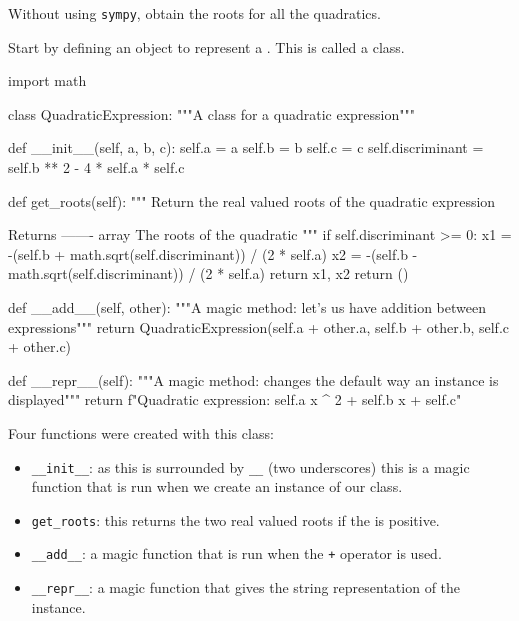 Without using \texttt{sympy}, obtain the roots for all the quadratics.

Start by defining an object to represent a . This is called a
class.


\begin{pyin}
import math


class QuadraticExpression:
    """A class for a quadratic expression"""

    def __init__(self, a, b, c):
        self.a = a
        self.b = b
        self.c = c
        self.discriminant = self.b ** 2 - 4 * self.a * self.c

    def get_roots(self):
        """
        Return the real valued roots of the quadratic expression

        Returns
        -------
        array
            The roots of the quadratic
        """
        if self.discriminant >= 0:
            x1 = -(self.b + math.sqrt(self.discriminant)) / (2 * self.a)
            x2 = -(self.b - math.sqrt(self.discriminant)) / (2 * self.a)
            return x1, x2
        return ()

    def __add__(self, other):
        """A magic method: let's us have addition between expressions"""
        return QuadraticExpression(self.a + other.a, self.b + other.b, self.c + other.c)

    def __repr__(self):
        """A magic method: changes the default way an instance is displayed"""
        return f"Quadratic expression: {self.a} x ^ 2 + {self.b} x + {self.c}"
\end{pyin}

\begin{note}
Four functions were created with this class:
\begin{itemize}
\item 

\texttt{\_\_init\_\_}: as this is surrounded by \texttt{\_\_} (two underscores) this is a magic
function that is run when we create an instance of our class.

\item 

\texttt{get\_roots}: this returns the two real valued roots if the
 is
positive.

\item 

\texttt{\_\_add\_\_}: a magic function that is run when the \texttt{+} operator is used.

\item 

\texttt{\_\_repr\_\_}: a magic function that gives the string representation of the
instance.

\end{itemize}
\end{note}


